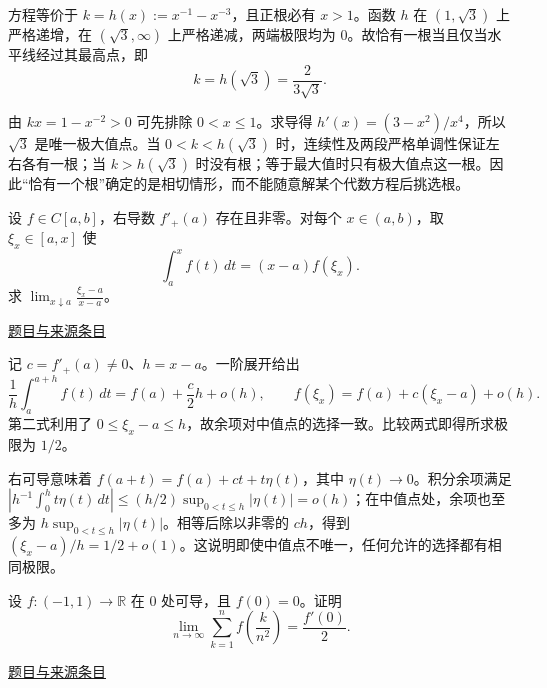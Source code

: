 \documentclass[UTF8,12pt,a4paper,fontset=fandol]{ctexart}
\begin{document}
\begin{solve}\label{ans:fin01-all:2}

方程等价于 $k=h(x):=x^{-1}-x^{-3}$，且正根必有 $x>1$。函数 $h$ 在 $(1,\sqrt3)$ 上严格递增，在 $(\sqrt3,\infty)$ 上严格递减，两端极限均为 $0$。故恰有一根当且仅当水平线经过其最高点，即
\[
k=h(\sqrt3)=\frac{2}{3\sqrt3}.
\]

由 $kx=1-x^{-2}>0$ 可先排除 $0<x\le1$。求导得 $h'(x)=(3-x^2)/x^4$，所以 $\sqrt3$ 是唯一极大值点。当 $0<k<h(\sqrt3)$ 时，连续性及两段严格单调性保证左右各有一根；当 $k>h(\sqrt3)$ 时没有根；等于最大值时只有极大值点这一根。因此“恰有一个根”确定的是相切情形，而不能随意解某个代数方程后挑选根。

\end{solve}

\begin{example}[来源序号3]\label{ex:fin01-all:3}\label{pr:fin01-all:3}

设 $f\in C[a,b]$，右导数 $f'_+(a)$ 存在且非零。对每个 $x\in(a,b)$，取 $\xi_x\in[a,x]$ 使
\[
\int_a^x f(t)\,dt=(x-a)f(\xi_x).
\]
求 $\displaystyle\lim_{x\downarrow a}\frac{\xi_x-a}{x-a}$。

\par\href{https://github.com/lzxcr/cmc-mathematics/blob/64916fa1fdbc3e444a652eca204d5669058ee321/src/problems/finals/01/03.md}{题目与来源条目}

\end{example}

\begin{solve}\label{ans:fin01-all:3}

记 $c=f'_+(a)\ne0$、$h=x-a$。一阶展开给出
\[
\frac1h\int_a^{a+h}f(t)\,dt=f(a)+\frac c2h+o(h),
\qquad
f(\xi_x)=f(a)+c(\xi_x-a)+o(h).
\]
第二式利用了 $0\le\xi_x-a\le h$，故余项对中值点的选择一致。比较两式即得所求极限为 $1/2$。

右可导意味着 $f(a+t)=f(a)+ct+t\eta(t)$，其中 $\eta(t)\to0$。积分余项满足 $|h^{-1}\int_0^h t\eta(t)\,dt|\le(h/2)\sup_{0<t\le h}|\eta(t)|=o(h)$；在中值点处，余项也至多为 $h\sup_{0<t\le h}|\eta(t)|$。相等后除以非零的 $ch$，得到 $(\xi_x-a)/h=1/2+o(1)$。这说明即使中值点不唯一，任何允许的选择都有相同极限。

\end{solve}

\begin{example}[来源序号5]\label{ex:fin01-all:5}\label{pr:fin01-all:5}

设 $f:(-1,1)\to\mathbb R$ 在 $0$ 处可导，且 $f(0)=0$。证明
\[
\lim_{n\to\infty}\sum_{k=1}^n f\!\left(\frac{k}{n^2}\right)=\frac{f'(0)}2.
\]

\par\href{https://github.com/lzxcr/cmc-mathematics/blob/64916fa1fdbc3e444a652eca204d5669058ee321/src/problems/finals/01/05.md}{题目与来源条目}

\end{example}
\end{document}
